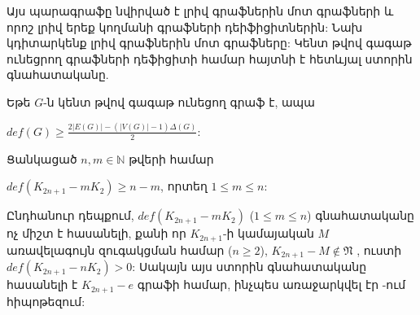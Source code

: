 Այս պարագրաֆը նվիրված է լրիվ գրաֆներին մոտ գրաֆների և որոշ լրիվ երեք կողմանի գրաֆների դեիֆիցիտներին: Նախ կդիտարկենք լրիվ գրաֆներին մոտ գրաֆները: Կենտ թվով գագաթ ունեցրող գրաֆների դեֆիցիտի համար հայտնի է հետևյալ ստորին գնահատականը.

\begin{theorem}
\label{t3_def_odd}\cite{B-OD-BHal} Եթե $G$-ն կենտ թվով գագաթ ունեցող գրաֆ է, ապա
\begin{center}
$def(G)\geq \frac{2\vert E(G)\vert -(\vert V(G)\vert
-1)\Delta(G)}{2}$:
\end{center}
\end{theorem}

\begin{corollary}
\label{c3_def_complete_minus_edges}\cite{B-OD-BHal} Ցանկացած $n,m\in \mathbb{N}$ թվերի համար 
\begin{center}
$def(K_{2n+1}-mK_{2})\geq n-m$, որտեղ $1\leq m\leq n$:
\end{center}
\end{corollary}

Ընդհանուր դեպքում, $def(K_{2n+1}-mK_{2})$ ($1\leq m\leq n$) գնահատականը ոչ միշտ է հասանելի, քանի որ $K_{2n+1}$-ի կամայական $M$ առավելագույն զուգակցման համար ($n\geq 2$), $K_{2n+1} - M\notin \mathfrak{N}$ \cite{Petrosyan2010}, ուստի
$def(K_{2n+1}-nK_{2})>0$: Սակայն այս ստորին գնահատականը հասանելի է 
$K_{2n+1} - e$ գրաֆի համար, ինչպես առաջարկվել էր \cite{B-OD-BHal}-ում հիպոթեզում:

